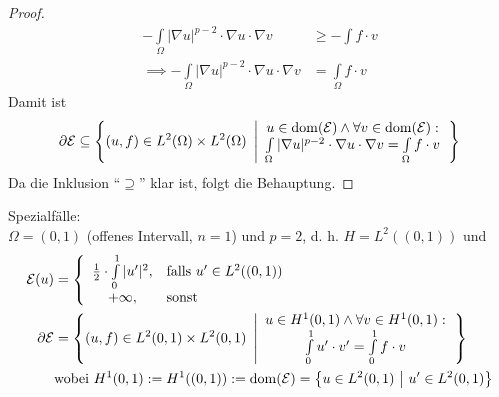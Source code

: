 \begin{beispiel}
\begin{proof}
\begin{align*}
			-\int\limits_\Omega|\nabla u|^{p-2}\cdot\nabla u\cdot\nabla v&\geq-\int\limits f\cdot v\\
			\implies
			-\int\limits_\Omega |\nabla u|^{p-2}\cdot\nabla u\cdot\nabla v&=\int\limits_\Omega f\cdot v
		\end{align*}
		Damit ist 
		\begin{align*}
			\partial\mathcal{E}\subseteq\left\lbrace(u,f)\in L^2(\Omega)\times L^2(\Omega)~\left|
			\begin{array}{c}
				u\in\operatorname{dom}(\mathcal{E})\wedge\forall v\in\operatorname{dom}(\mathcal{E}):\\
				\int\limits_\Omega|\nabla u|^{p-2}\cdot\nabla u\cdot\nabla v=\int\limits_\Omega f\cdot v
			\end{array}
			\right.\right\rbrace
		\end{align*}
		Da die Inklusion ``$\supseteq$'' klar ist, folgt die Behauptung.
	\end{proof}
	Spezialfälle:\\
	$\Omega=(0,1)$ (offenes Intervall, $n=1$) und $p=2$, d. h. $H=L^2((0,1))$ und 
	\begin{align*}
		\mathcal{E}(u)&=\left\lbrace\begin{array}{cl}
			\frac{1}{2}\cdot\int\limits_0^1|u'|^2,&\text{falls } u'\in L^2((0,1))\\
			+\infty, &\text{sonst }
		\end{array}\right.\\
		\partial\mathcal{E}&=\left\lbrace(u,f)\in L^2(0,1)\times L^2(0,1)~\left|
		\begin{array}{c}
			u\in H^1(0,1)\wedge\forall v\in H^1(0,1):\\
			\int\limits_0^1 u'\cdot v'=\int\limits_0^1 f\cdot v
		\end{array}
		\right.\right\rbrace\\
		&\text{wobei } H^1(0,1):=H^1((0,1)):=\operatorname{dom}(\mathcal{E})=\big\lbrace u\in L^2(0,1)~\big|~u'\in L^2(0,1)\big\rbrace
	\end{align*}


\end{beispiel}
